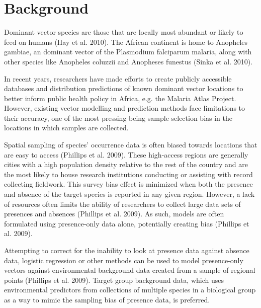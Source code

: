 \documentclass[sn-nature]{sn-jnl}%
\begin{document}



\maketitle

\section*{Background}\label{background}
Dominant vector species are those that are locally most abundant or likely to feed on humans (Hay et al. 2010). The African continent is home to Anopheles gambiae, an dominant vector of the Plasmodium falciparum malaria, along with other species like Anopheles coluzzii and Anopheses funestus (Sinka et al. 2010).

In recent years, researchers have made efforts to create publicly accessible databases and distribution predictions of known dominant vector locations to better inform public health policy in Africa, e.g. the Malaria Atlas Project. However, existing vector modelling and prediction methods face limitations to their accuracy, one of the most pressing being sample selection bias in the locations in which samples are collected. 

Spatial sampling of species' occurrence data is often biased towards locations that are easy to access (Phillips et al. 2009). These high-access regions are generally cities with a high population density relative to the rest of the country and are the most likely to house research institutions conducting or assisting with record collecting fieldwork. This survey bias effect is minimized when both the presence and absence of the target species is reported in any given region. However, a lack of resources often limits the ability of researchers to collect large data sets of presences and absences (Phillips et al. 2009). As such, models are often formulated using presence-only data alone, potentially creating bias (Phillips et al. 2009). 

Attempting to correct for the inability to look at presence data against absence data, logistic regression or other methods can be used to model presence-only vectors against environmental background data created from a sample of regional points (Phillips et al. 2009). Target group background data, which uses environmental predictors from collections of multiple species in a biological group as a way to mimic the sampling bias of presence data, is preferred. 
\end{document}
